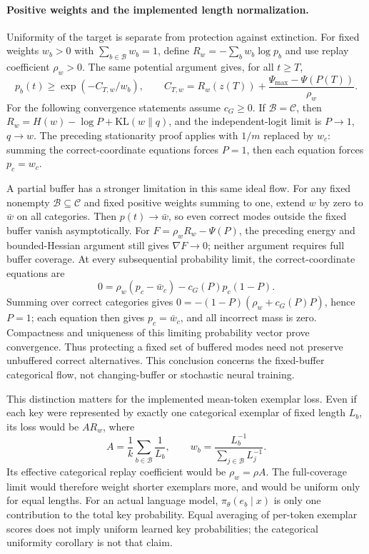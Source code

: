 \paragraph{Positive weights and the implemented length normalization.}
Uniformity of the target is separate from protection against extinction.
For fixed weights $w_b>0$ with $\sum_{b\in\mathcal B}w_b=1$, define
$R_w=-\sum_b w_b\log p_b$ and use replay coefficient $\rho_w>0$.
The same potential argument gives, for all $t\ge T$,
\[
 p_b(t)\ge\exp(-C_{T,w}/w_b),\qquad
 C_{T,w}=R_w(z(T))+\frac{\Psi_{\max}-\Psi(P(T))}{\rho_w}.
\]
For the following convergence statements assume $c_G\ge0$.
If $\mathcal B=\mathcal C$, then
$R_w=H(w)-\log P+\mathrm{KL}(w\|q)$, and the independent-logit limit is
$P\to1$, $q\to w$. The preceding stationarity proof applies with $1/m$
replaced by $w_c$: summing the correct-coordinate equations forces $P=1$,
then each equation forces $p_c=w_c$.

A partial buffer has a stronger limitation in this same ideal flow. For any
fixed nonempty $\mathcal B\subseteq\mathcal C$ and fixed positive weights
summing to one, extend $w$ by zero to $\bar w$ on all categories. Then
$p(t)\to\bar w$, so even correct modes outside the fixed buffer vanish
asymptotically. For $F=\rho_wR_w-\Psi(P)$, the preceding energy and
bounded-Hessian argument still gives $\nabla F\to0$; neither argument
requires full buffer coverage.
At every subsequential probability limit, the correct-coordinate equations are
\[
 0=\rho_w(p_c-\bar w_c)-c_G(P)p_c(1-P).
\]
Summing over correct categories gives
$0=-(1-P)(\rho_w+c_G(P)P)$, hence $P=1$; each equation then gives
$p_c=\bar w_c$, and all incorrect mass is zero. Compactness and uniqueness
of this limiting probability vector prove convergence. Thus protecting a
fixed set of buffered modes need not preserve unbuffered correct alternatives.
This conclusion concerns the fixed-buffer categorical flow, not changing-buffer
or stochastic neural training.

This distinction matters for the implemented mean-token exemplar loss.
Even if each key were represented by exactly one categorical exemplar of
fixed length $L_b$, its loss would be $A R_w$, where
\[
 A=\frac1k\sum_{b\in\mathcal B}\frac1{L_b},\qquad
 w_b=\frac{L_b^{-1}}{\sum_{j\in\mathcal B}L_j^{-1}}.
\]
Its effective categorical replay coefficient would be $\rho_w=\rho A$.
The full-coverage limit would therefore weight shorter exemplars more, and
would be uniform only for equal lengths. For an actual language model,
$\pi_\theta(e_b\mid x)$ is only one contribution to the total key probability.
Equal averaging of per-token exemplar scores does not imply uniform learned
key probabilities; the categorical uniformity corollary is not that claim.

